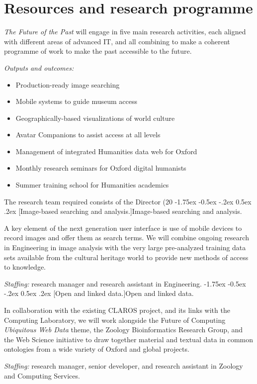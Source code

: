\documentclass[11pt,twoside]{article}\makeatletter
\makeatletter
\renewcommand\section{\@startsection {section}{1}{\z@}%
     {-1.75ex \@plus -0.5ex \@minus -.2ex}%
     {0.5ex \@plus .2ex}%
     {\reset@font\Large\bfseries\sffamily}}
\renewcommand\subsection{\@startsection{subsection}{2}{\z@}%
     {-1.75ex\@plus -0.5ex \@minus- .2ex}%
     {0.5ex \@plus .2ex}%
     {\reset@font\Large\sffamily}}
\def\DivI{\section}
\def\DivII{\subsection}
\def\DivI{\chapter}
\def\DivII{\section}
\makeatother
\begin{document}
\DivI[Resources and research programme]{Resources and research programme}\par \textit{The Future of the Past} will engage in five main research activities, each aligned with different areas of advanced IT, and all combining to make a coherent programme of work to make the past accessible to the future. \par \textit{Outputs and outcomes:}\begin{itemize}

\item Production-ready image searching
\item Mobile systems to guide museum access
\item Geographically-based visualizations of world culture
\item Avatar Companions to assist access at all levels
\item Management of integrated Humanities data web for Oxford
\item Monthly research seminars for Oxford digital humanists
\item Summer training school for Humanities academics
\end{itemize} \par The research team required consists of the Director (20%
\DivII[Image-based searching and analysis.]{Image-based searching and analysis. }\par A key element of the next generation user interface is use of mobile devices to record images and offer them as search terms. We will combine ongoing research in Engineering in image analysis with the very large pre-analyzed training data sets available from the cultural heritage world to provide new methods of access to knowledge.\par \textit{Staffing:} research manager and research assistant in Engineering.
\DivII[Open and linked data.]{Open and linked data. }\par In collaboration with the existing CLAROS project, and its links with the Computing Laboratory, we will work alongside the Future of Computing \textit{Ubiquitous Web Data} theme, the Zoology Bioinformatics Research Group, and the Web Science initiative to draw together material and textual data in common ontologies from a wide variety of Oxford and global projects.\par \textit{Staffing:} research manager, senior developer, and research assistant in Zoology and Computing Services.
\end{document}
